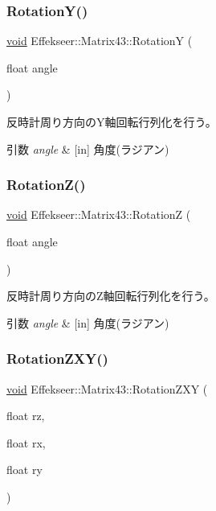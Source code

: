 \subsubsection{\texorpdfstring{Rotation\+Y()}{RotationY()}}
{\footnotesize\ttfamily \mbox{\hyperlink{namespace_effekseer_ab34c4088e512200cf4c2716f168deb56}{void}} Effekseer\+::\+Matrix43\+::\+RotationY (\begin{DoxyParamCaption}\item[{float}]{angle }\end{DoxyParamCaption})}



反時計周り方向の\+Y軸回転行列化を行う。 


\begin{DoxyParams}{引数}
{\em angle} & \mbox{[}in\mbox{]} 角度(ラジアン) \\
\hline
\end{DoxyParams}
\mbox{\label{struct_effekseer_1_1_matrix43_a5e37a336a79787b7a45c836403f3bb62}} 
\subsubsection{\texorpdfstring{Rotation\+Z()}{RotationZ()}}
{\footnotesize\ttfamily \mbox{\hyperlink{namespace_effekseer_ab34c4088e512200cf4c2716f168deb56}{void}} Effekseer\+::\+Matrix43\+::\+RotationZ (\begin{DoxyParamCaption}\item[{float}]{angle }\end{DoxyParamCaption})}



反時計周り方向の\+Z軸回転行列化を行う。 


\begin{DoxyParams}{引数}
{\em angle} & \mbox{[}in\mbox{]} 角度(ラジアン) \\
\hline
\end{DoxyParams}
\mbox{\label{struct_effekseer_1_1_matrix43_a96455579cd7fa90c40f9a55809b80e49}} 
\subsubsection{\texorpdfstring{Rotation\+Z\+X\+Y()}{RotationZXY()}}
{\footnotesize\ttfamily \mbox{\hyperlink{namespace_effekseer_ab34c4088e512200cf4c2716f168deb56}{void}} Effekseer\+::\+Matrix43\+::\+Rotation\+Z\+XY (\begin{DoxyParamCaption}\item[{float}]{rz,  }\item[{float}]{rx,  }\item[{float}]{ry }\end{DoxyParamCaption})}



